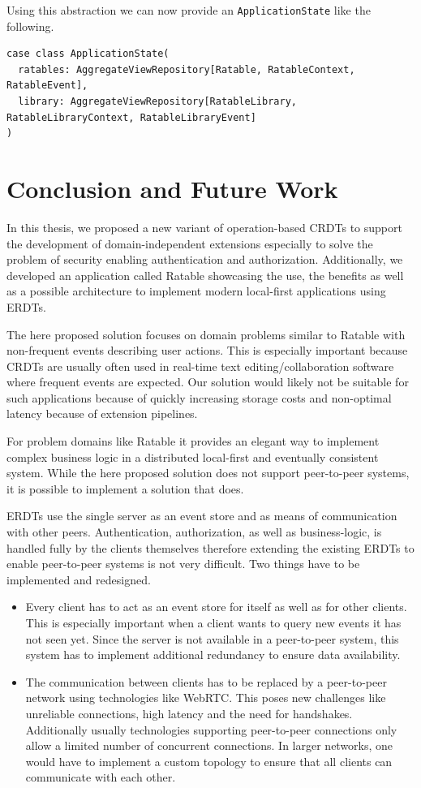 \documentclass[
	english,
	ruledheaders=section,   %
	class=report,		    %
	thesis={type=bachelor}, %
	accentcolor=9c,			%
	custommargins=true,    %
	marginpar=false,        %
	parskip=half-,          %
	fontsize=11pt,          %
]{tudapub}
\begin{document}
Using this abstraction we can now provide an \texttt{ApplicationState} like the following.

\begin{lstlisting}
case class ApplicationState(
  ratables: AggregateViewRepository[Ratable, RatableContext, RatableEvent],
  library: AggregateViewRepository[RatableLibrary, RatableLibraryContext, RatableLibraryEvent]
)
\end{lstlisting}

\chapter{Conclusion and Future Work}
In this thesis, we proposed a new variant of operation-based CRDTs to support the development of domain-independent extensions especially to solve the problem of security enabling authentication and authorization. Additionally, we developed an application called Ratable showcasing the use, the benefits as well as a possible architecture to implement modern local-first applications using ERDTs.

The here proposed solution focuses on domain problems similar to Ratable with non-frequent events describing user actions. This is especially important because CRDTs are usually often used in real-time text editing/collaboration software where frequent events are expected. Our solution would likely not be suitable for such applications because of quickly increasing storage costs and non-optimal latency because of extension pipelines.

For problem domains like Ratable it provides an elegant way to implement complex business logic in a distributed local-first and eventually consistent system. While the here proposed solution does not support peer-to-peer systems, it is possible to implement a solution that does.

ERDTs use the single server as an event store and as means of communication with other peers. Authentication, authorization, as well as business-logic, is handled fully by the clients themselves therefore extending the existing ERDTs to enable peer-to-peer systems is not very difficult. Two things have to be implemented and redesigned.

\begin{itemize}
  \item Every client has to act as an event store for itself as well as for other clients. This is especially important when a client wants to query new events it has not seen yet. Since the server is not available in a peer-to-peer system, this system has to implement additional redundancy to ensure data availability.
  \item The communication between clients has to be replaced by a peer-to-peer network using technologies like WebRTC. This poses new challenges like unreliable connections, high latency and the need for handshakes. Additionally usually technologies supporting peer-to-peer connections only allow a limited number of concurrent connections. In larger networks, one would have to implement a custom topology to ensure that all clients can communicate with each other.
\end{itemize}
\end{document}
